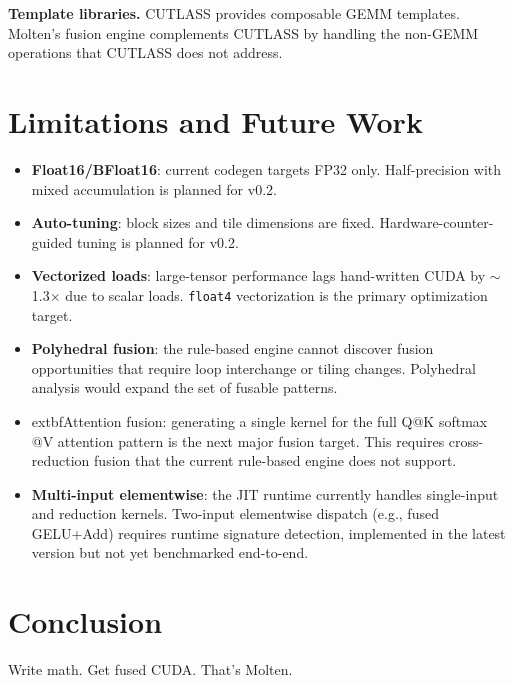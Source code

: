 \documentclass[11pt,a4paper]{article}
\begin{document}
\textbf{Template libraries.} CUTLASS \cite{kerr2017cutlass} provides composable
GEMM templates. Molten's fusion engine complements CUTLASS by handling the
non-GEMM operations that CUTLASS does not address.

\section{Limitations and Future Work}

\begin{itemize}
  \item \textbf{Float16/BFloat16}: current codegen targets FP32 only.
    Half-precision with mixed accumulation is planned for v0.2.
  \item \textbf{Auto-tuning}: block sizes and tile dimensions are fixed.
    Hardware-counter-guided tuning is planned for v0.2.
  \item \textbf{Vectorized loads}: large-tensor performance lags hand-written
    CUDA by $\sim$1.3$\times$ due to scalar loads. \texttt{float4} vectorization
    is the primary optimization target.
  \item \textbf{Polyhedral fusion}: the rule-based engine cannot discover
    fusion opportunities that require loop interchange or tiling changes.
    Polyhedral analysis would expand the set of fusable patterns.
  \item 	extbf{Attention fusion}: generating a single kernel for the
    full Q@K softmax @V attention pattern is the next major fusion target.
    This requires cross-reduction fusion that the current rule-based engine
    does not support.
  \item \textbf{Multi-input elementwise}: the JIT runtime currently handles
    single-input and reduction kernels. Two-input elementwise dispatch
    (e.g., fused GELU+Add) requires runtime signature detection, implemented
    in the latest version but not yet benchmarked end-to-end.
\end{itemize}

\section{Conclusion}

Write math. Get fused CUDA. That's Molten.
\end{document}
